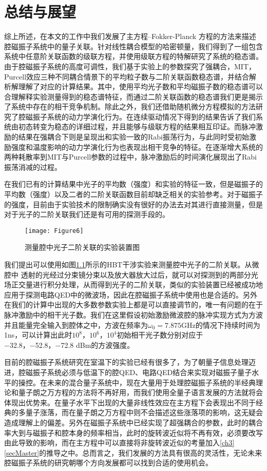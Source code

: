 
\chapter{总结与展望}
\label{ch6}

综上所述，在本文的工作中我们发展了主方程--Fokker-Planck 方程的方法来描述腔磁振子系统中的量子关联。针对线性耦合模型的哈密顿量，我们得到了一组包含系统中任意阶关联函数的级联方程，并使用级联方程的特解研究了系统的稳态谱。由于腔磁振子系统的高度可调性，我们基于实验上的参数探究了强耦合，MIT，Purcell效应三种不同耦合情景下的平均粒子数与二阶关联函数稳态谱，并结合解析解理解了对应的计算结果。其中，使用平均光子数和平均磁振子数的稳态谱可以合理解释实验测量得到的稳态谱特征，而通过二阶关联函数的稳态谱我们更是揭示了系统中存在的相干竞争机制。除此之外，我们还借助随机微分方程模拟的方法研究了腔磁振子系统的动力学演化行为。在连续驱动情况下得到的结果告诉了我们系统由初态转变为稳态的详细过程，并且能够与级联方程的结果相互印证。而脉冲激励的结果在强耦合下则是呈现出和实验一致的Rabi振荡行为，与此同时受初始激励强度和温度影响的动力学演化行为也表现出相干竞争的特征。在逐渐增大系统的两种耗散率到MIT与Purcell参数的过程中，脉冲激励后的时间演化展现出了Rabi振荡消减的过程。

在我们已有的计算结果中光子的平均数（强度）和实验的特征一致，但是磁振子的平均数（强度）以及二者的二阶关联函数目前却缺乏相关的实验参考。对于磁振子的强度，目前由于实验技术的限制确实没有很好的办法去对其进行直接测量，但是对于光子的二阶关联我们还是有可用的探测手段的。
\begin{figure}[htbp]
	\centering
	\texttt{[image: Figure6]}
	\caption{测量腔中光子二阶关联的实验装置图} 
	\label{HBTExperiment}
\end{figure}
我们提出可以使用如图\ref{HBTExperiment}所示的HBT干涉实验来测量腔中光子的二阶关联。从微腔中
透射的光经过分束镜分束以及放大器放大过后，就可以对探测到的两部分光场正交量进行积分处理，从而得到光子的二阶关联，类似的实验装置已经被成功地应用于探测电路QED中的微波场，因此在腔磁振子系统中使用也是合适的。另外在我们的计算中出现的大多数参数实验上都是可以直接调节的，唯一有问题的在于脉冲激励中的相干光子数。我们在这里假设初始激励微波腔的脉冲实现方式为方波并且能量完全输入到腔体之中，方波在频率为$\omega_0=7.875$GHz的情况下持续时间为1ns，可以计算出此时$10^8$，$10^6$，$10^4$初始相干光子数分别对应于−32.8，−52.8，−72.8 dBm的方波强度。

目前的腔磁振子系统研究在室温下的实验已经有很多了，为了朝量子信息处理迈进，腔磁振子系统必须与低温下的腔QED、电路QED结合来实现对磁振子量子水平的操控。在未来的混合量子系统中，现在大量用于处理腔磁振子系统的半经典理论和量子朗之万方程的方法将不再好用，而我们使用全量子语言发展的方法就将会体现出优势来。在量子水平下出现的大量非线性效应在主方程下会表现出不同于经典的多量子涨落，而在量子朗之万方程中则不会描述这些涨落项的影响，这无疑会造成理解上的偏差。另外在磁振子系统中已经实现了超强耦合的参数，此时的耦合率大到与磁振子和腔本身的频率相当，此时的旋转波近似将不再有效，必须要改写由此导致的影响，而在主方程中可以直接将非旋转波近似的考量加入\ref{ch3}\ref{secMaster}的推导之中。总而言之，我们发展的方法具有很高的灵活性，无论未来腔磁振子系统的研究朝哪个方向发展都可以找到合适的使用机会。